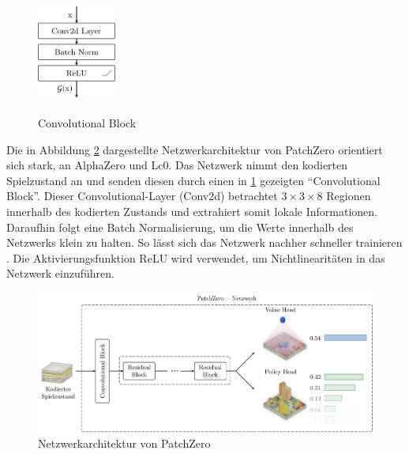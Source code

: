 \begin{figure}
    \vspace*{-0.5cm}
    \includegraphics[width=0.23\textwidth]{res/pictures/conv-block.pdf}
    \centering
    \caption[Convolutional Block]{\unskip}
    Convolutional Block
    \label{fig:conv-block}
\end{figure}

Die in Abbildung \ref{fig:patch-zero-architecture} dargestellte Netzwerkarchitektur von PatchZero orientiert sich stark, an AlphaZero und \ac{Lc0}. Das Netzwerk nimmt den kodierten Spielzustand an und senden diesen durch einen in \ref{fig:conv-block} gezeigten \enquote{Convolutional Block}. Dieser Convolutional-Layer (Conv2d) betrachtet $3\times 3 \times 8$ Regionen innerhalb des kodierten Zustands und extrahiert somit lokale Informationen. Daraufhin folgt eine Batch Normalisierung, um die Werte innerhalb des Netzwerks klein zu halten. So lässt sich das Netzwerk nachher schneller trainieren \cite{2018.BatchNorm}. Die Aktivierungsfunktion \ac{ReLU} wird verwendet, um Nichtlinearitäten in das Netzwerk einzuführen.

\vspace*{-5cm}
\pagebreak

\begin{figure}[!ht]
    \centering
    \includegraphics[width=\textwidth]{res/pictures/patch-zero-architecture.pdf}
    \caption{Netzwerkarchitektur von PatchZero}
    \label{fig:patch-zero-architecture}
\end{figure}

